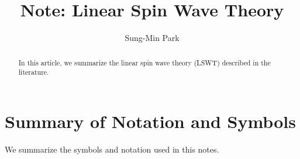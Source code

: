 \documentclass[aps, prx, nofootinbib, preprintnumbers, superscriptaddress]{revtex4-2}
\begin{document}
\title{Note: Linear Spin Wave Theory}
\author{Sung-Min Park}
\begin{abstract}
    In this article, we summarize the linear spin wave theory (LSWT) described in the literature.
\end{abstract}
\maketitle

\tableofcontents

\newpage
\section*{Summary of Notation and Symbols}

We summarize the symbols and notation used in this notes.
\end{document}
